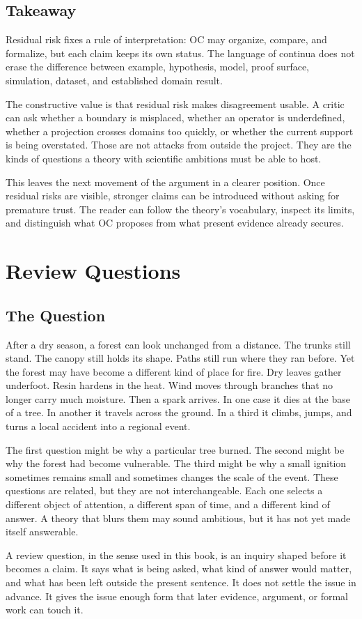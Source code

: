 \documentclass[11pt,a4paper,openany]{book}
\begin{document}
\subsection{Takeaway}
Residual risk fixes a rule of interpretation: OC may organize, compare, and formalize, but each claim keeps its own status. The language of continua does not erase the difference between example, hypothesis, model, proof surface, simulation, dataset, and established domain result. \cite{kauffman_autocatalytic,raf_networks}\par
The constructive value is that residual risk makes disagreement usable. A critic can ask whether a boundary is misplaced, whether an operator is underdefined, whether a projection crosses domains too quickly, or whether the current support is being overstated. Those are not attacks from outside the project. They are the kinds of questions a theory with scientific ambitions must be able to host.\par
This leaves the next movement of the argument in a clearer position. Once residual risks are visible, stronger claims can be introduced without asking for premature trust. The reader can follow the theory's vocabulary, inspect its limits, and distinguish what OC proposes from what present evidence already secures.\par
\section{Review Questions}
\subsection{The Question}
After a dry season, a forest can look unchanged from a distance. The trunks still stand. The canopy still holds its shape. Paths still run where they ran before. Yet the forest may have become a different kind of place for fire. Dry leaves gather underfoot. Resin hardens in the heat. Wind moves through branches that no longer carry much moisture. Then a spark arrives. In one case it dies at the base of a tree. In another it travels across the ground. In a third it climbs, jumps, and turns a local accident into a regional event. \cite{raf_networks,bak_soc}\par
The first question might be why a particular tree burned. The second might be why the forest had become vulnerable. The third might be why a small ignition sometimes remains small and sometimes changes the scale of the event. These questions are related, but they are not interchangeable. Each one selects a different object of attention, a different span of time, and a different kind of answer. A theory that blurs them may sound ambitious, but it has not yet made itself answerable.\par
A review question, in the sense used in this book, is an inquiry shaped before it becomes a claim. It says what is being asked, what kind of answer would matter, and what has been left outside the present sentence. It does not settle the issue in advance. It gives the issue enough form that later evidence, argument, or formal work can touch it.\par
\end{document}

